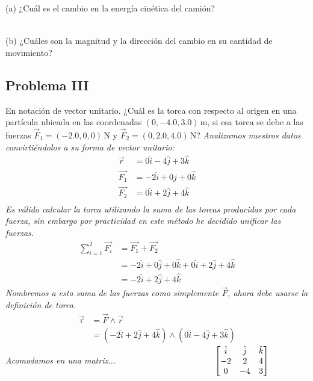 \documentclass{article}
\begin{document}
   (a) ¿Cuál es el cambio en la energía cinética del camión?

\begin{align*}
    
\end{align*}

   (b) ¿Cuáles son la magnitud y la dirección del cambio en su cantidad de movimiento?

\newpage
\subsection*{Problema III}
   En notación de vector unitario. ¿Cuál es la torca con respecto al origen en una partícula ubicada en las coordenadas \((0,-4.0,3.0)\,\text{m}\), si esa torca se debe a las fuerzas \(\vec{F}_1 = (-2.0,0,0)\,\text{N}\) y \(\vec{F}_2 = (0,2.0,4.0)\,\text{N}\)?
\textit{Analizamos nuestros datos convirtiéndolos a su forma de vector unitario:}
\begin{align*}
    \vec{r} &= 0\hat{i} - 4\hat{j} + 3\hat{k} \\
    \vec{F_1} &= -2\hat{i} + 0\hat{j} + 0\hat{k} \\
    \vec{F_2} &= 0\hat{i} + 2\hat{j} + 4\hat{k} \\
\end{align*}
\textit{Es válido calcular la torca utilizando la suma de las torcas producidas por cada fuerza, sin embargo por practicidad en este método he decidido unificar las fuerzas.}\\
\begin{align*}
    \sum_{i=1}^{2}\vec{F_i} &= \vec{F_1} + \vec{F_2} \\
    &= -2\hat{i} + 0\hat{j} + 0\hat{k} + 0\hat{i} + 2\hat{j} + 4\hat{k} \\
    &= -2\hat{i} + 2\hat{j} + 4\hat{k}
\end{align*}
\textit{Nombremos a esta suma de las fuerzas como simplemente $\vec{F}$, ahora debe usarse la definición de torca.}\\
\begin{align*}
    \vec{\tau} &= \vec{F} \land \vec{r} \\
    &= (-2\hat{i} + 2\hat{j} + 4\hat{k}) \land (0\hat{i} - 4\hat{j} + 3\hat{k})
\end{align*}
\textit{Acomodamos en una matriz...}
$\hspace*{4cm} \begin{bmatrix}
    \hat{i} & \hat{j} & \hat{k} \\
    -2 & 2 & 4 \\
    0 & -4 & 3 \\
    \end{bmatrix}$ \\
\end{document}
